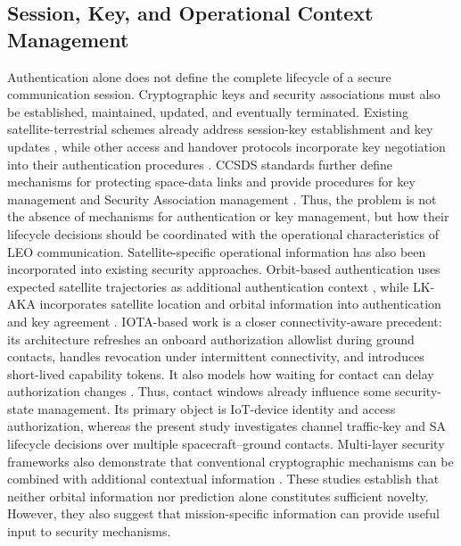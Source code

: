 \documentclass[conference]{IEEEtran}
\begin{document}
\subsection{Session, Key, and Operational Context Management}
Authentication alone does not define the complete lifecycle of a secure communication session. Cryptographic keys and security associations must also be established, maintained, updated, and eventually terminated. Existing satellite-terrestrial schemes already address session-key establishment and key updates \cite{ref15}, while other access and handover protocols incorporate key negotiation into their authentication procedures \cite{ref9,ref11,ref12}. CCSDS standards further define mechanisms for protecting space-data links and provide procedures for key management and Security Association management \cite{ref16,ref17}. Thus, the problem is not the absence of mechanisms for authentication or key management, but how their lifecycle decisions should be coordinated with the operational characteristics of LEO communication. 
Satellite-specific operational information has also been incorporated into existing security approaches. Orbit-based authentication uses expected satellite trajectories as additional authentication context \cite{ref18}, while LK-AKA incorporates satellite location and orbital information into authentication and key agreement \cite{ref19}. IOTA-based work is a closer connectivity-aware precedent: its architecture refreshes an onboard authorization allowlist during ground contacts, handles revocation under intermittent connectivity, and introduces short-lived capability tokens. It also models how waiting for contact can delay authorization changes \cite{ref20}. Thus, contact windows already influence some security-state management. Its primary object is IoT-device identity and access authorization, whereas the present study investigates channel traffic-key and SA lifecycle decisions over multiple spacecraft--ground contacts. Multi-layer security frameworks also demonstrate that conventional cryptographic mechanisms can be combined with additional contextual information \cite{ref21}. These studies establish that neither orbital information nor prediction alone constitutes sufficient novelty. However, they also suggest that mission-specific information can provide useful input to security mechanisms. 
\end{document}
